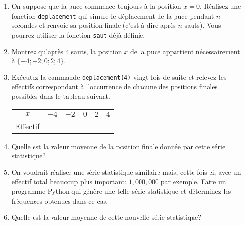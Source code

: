 \begin{exercise}
\begin{enumerate}
\begin{center}
\begin{varwidth}[t]{.5\textwidth}
\begin{lstlisting}[language=iPython,linewidth = 6cm]
def saut(x):
    a = randint(0,1)
    if a == 1:
        return ...
    else:
        return ...\end{lstlisting}\end{varwidth}\end{center}
		\item On suppose que la puce commence toujours à la position $x=0$. Réalisez une fonction \texttt{deplacement} qui simule le déplacement de la puce pendant $n$ secondes et renvoie sa position finale (c'est-à-dire après $n$ sauts). Vous pourrez utiliser la fonction \texttt{saut} déjà définie.
		\item Montrez qu'après 4 sauts, la position $x$ de la puce appartient nécessairement à $\{-4;-2;0;2;4\}$.
		\item Exécutez la commande \texttt{deplacement(4)} vingt fois de suite et relevez les effectifs correspondant à l'occurrence de chacune des positions finales possibles dans le tableau suivant.
		\begin{center}
			\begin{tabular}{|c|C{1cm}|C{1cm}|C{1cm}|C{1cm}|C{1cm}|}
				\hline
				$x$ & $-4$ & $-2$ & $0$ & $2$ & $4$ \\\hline
				Effectif &  &  &  &  &  \\\hline
			\end{tabular}
		\end{center}
		\item Quelle est la valeur moyenne de la position finale donnée par cette série statistique?
		\item On voudrait réaliser une série statistique similaire mais, cette fois-ci, avec un effectif total beaucoup plus important: $1,000,000$ par exemple. Faire un programme Python qui génère une telle série statistique et déterminez les fréquences obtenues dans ce cas.
		\item Quelle est la valeur moyenne de cette nouvelle série statistique?
	\end{enumerate}
\end{exercise}

